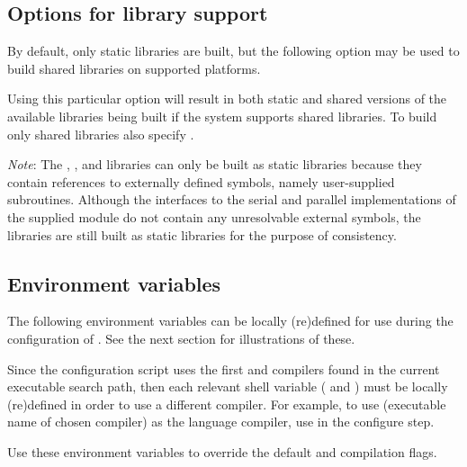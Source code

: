 \subsection*{Options for library support}

\noindent By default, only static libraries are built, but the following option
may be used to build shared libraries on supported platforms.

\begin{config}

\item {}

  Using this particular option will result in both static and shared versions of
  the available {\sundials} libraries being built if the system supports shared
  libraries. To build only shared libraries also specify .

  {\em Note}: The {\fcvode}, {\fkinsol}, and {\fida} libraries can only be built as
  static libraries because they contain references to externally defined symbols,
  namely user-supplied {\F} subroutines.  Although the {\F} interfaces to the serial
  and parallel implementations of the supplied {\nvector} module do not contain any
  unresolvable external symbols, the libraries are still built as static libraries
  for the purpose of consistency.

\end{config}

\subsection*{Environment variables}


\noindent The following environment variables can be locally (re)defined for use 
during the configuration of {\sundials}. See the next section for
illustrations of these.

\begin{config}

\item {}

\item {}

  Since the configuration script uses the first {\C} and {\F} compilers found in
  the current executable search path, then each relevant shell variable (
  and ) must be locally (re)defined in order to use a different compiler. 
  For example, to use  (executable name of chosen compiler) as the {\C}
  language compiler, use  in the configure step.

\item {}

\item {}

  Use these environment variables to override the default {\C} and {\F}
  compilation flags.

\end{config}


